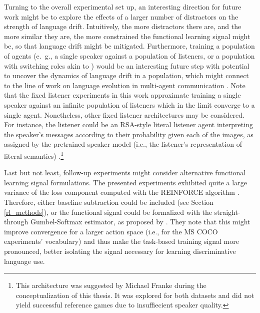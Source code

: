 Turning to the overall experimental set up, an interesting direction for future work might be to explore the effects of a larger number of distractors on the strength of language drift. Intuitively, the more distractors there are, and the more similar they are, the more constrained the functional learning signal might be, so that language drift might be mitigated.  Furthermore, training a population of agents (e.~g., a single speaker against a population of listeners, or a population with switching roles akin to \cite{bouchacourt2019miss}) would be an interesting future step with potential to uncover the dynamics of language drift in a population, which might connect to the line of work on language evolution in multi-agent communication \parencite[e.~g.,][]{graesser2019emergent, chaabouni2019anti, kirby2014iterated}. Note that the fixed listener experiments in this work approximate training a single speaker against an infinite population of listeners which in the limit converge to a single agent. Nonetheless, other fixed listener architectures may be considered. For instance, the listener could be an RSA-style literal listener agent interpreting the speaker's messages according to their probability given each of the images, as assigned by the pretrained speaker model (i.e., the listener's representation of literal semantics) \parencite[cf.][]{frank2016rational}.\footnote{This architecture was suggested by Michael Franke during the conceptualization of this thesis. It was explored for both datasets and did not yield successful reference games due to insuffiecient speaker quality.} 

Last but not least, follow-up experiments might consider alternative functional learning signal formulations. The presented experiments exhibited quite a large variance of the loss component computed with the REINFORCE algorithm . Therefore, either baseline subtraction could be included (see Section \ref{rl_methods}), or the functional signal could be formalized with the straight-through Gumbel-Softmax estimator, as proposed by \cite{havrylov2017emergence}. They note that this might improve convergence for a larger action space (i.e., for the MS COCO experiments' vocabulary) and thus make the task-based training signal more pronounced, better isolating the signal necessary for learning discriminative language use.

